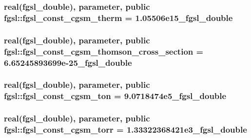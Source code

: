 \hypertarget{classfgsl_a3a73d93cd550287bba936f1fe898b44b}{
\subsubsection[{fgsl\-\_\-const\-\_\-cgsm\-\_\-therm}]{\setlength{\rightskip}{0pt plus 5cm}real({\bf fgsl\-\_\-double}), parameter, public fgsl\-::fgsl\-\_\-const\-\_\-cgsm\-\_\-therm = 1.\-05506e15\-\_\-fgsl\-\_\-double}}\label{classfgsl_a3a73d93cd550287bba936f1fe898b44b}
\hypertarget{classfgsl_a1581b093a3a9c09cff62c4bee45c1dcd}{
\subsubsection[{fgsl\-\_\-const\-\_\-cgsm\-\_\-thomson\-\_\-cross\-\_\-section}]{\setlength{\rightskip}{0pt plus 5cm}real({\bf fgsl\-\_\-double}), parameter, public fgsl\-::fgsl\-\_\-const\-\_\-cgsm\-\_\-thomson\-\_\-cross\-\_\-section = 6.\-65245893699e-\/25\-\_\-fgsl\-\_\-double}}\label{classfgsl_a1581b093a3a9c09cff62c4bee45c1dcd}
\hypertarget{classfgsl_a4f163ec06fee37b45bf96990c803601e}{
\subsubsection[{fgsl\-\_\-const\-\_\-cgsm\-\_\-ton}]{\setlength{\rightskip}{0pt plus 5cm}real({\bf fgsl\-\_\-double}), parameter, public fgsl\-::fgsl\-\_\-const\-\_\-cgsm\-\_\-ton = 9.\-0718474e5\-\_\-fgsl\-\_\-double}}\label{classfgsl_a4f163ec06fee37b45bf96990c803601e}
\hypertarget{classfgsl_a94ff1d0989beeed6065313b2a63530cb}{
\subsubsection[{fgsl\-\_\-const\-\_\-cgsm\-\_\-torr}]{\setlength{\rightskip}{0pt plus 5cm}real({\bf fgsl\-\_\-double}), parameter, public fgsl\-::fgsl\-\_\-const\-\_\-cgsm\-\_\-torr = 1.\-33322368421e3\-\_\-fgsl\-\_\-double}}\label{classfgsl_a94ff1d0989beeed6065313b2a63530cb}
